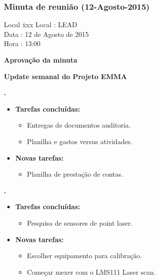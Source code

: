 \subsubsection{Minuta de reunião (12-Agosto-2015)}

\begin{tabbing}
  Local \= xxx \kill
  Local \> : LEAD \\
  Data  \> : 12 de Agosto de 2015 \\
  Hora  \> : 13:00
\end{tabbing}


\textbf{Aprovação da minuta}

\textbf{Update semanal do Projeto EMMA}

\textbf{\alana.} 
	\begin{itemize}
		\item \textbf{Tarefas concluídas:}
			\begin{itemize}    
				\item Entregas de documentos auditoria.
				\item Planilha e gastos versus atividades.
			\end{itemize}
		
		\item \textbf{Novas tarefas:}
			\begin{itemize} 
				\item Planilha de prestação de contas. 
			\end{itemize}
	\end{itemize}   							

\textbf{\elael.} 
	\begin{itemize}
		\item \textbf{Tarefas concluídas:}
			\begin{itemize}    
				\item Pesquisa de sensores de point laser. 
			\end{itemize}
		
		\item \textbf{Novas tarefas:}
			\begin{itemize} 
				\item Escolher equipamento para calibração.
				\item Começar mexer com o LMS111 Laser scan. 
			\end{itemize}
	\end{itemize}
	
